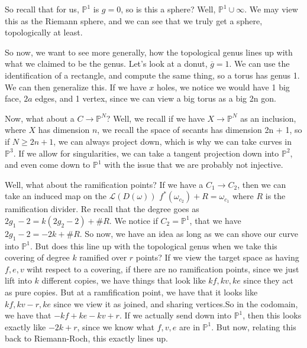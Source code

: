\documentclass[10pt]{article}
\begin{document}
So recall that for us, $\mathbb{P}^1$ is $g = 0$, so is this a sphere? Well, $\mathbb{P}^1 \cup \infty$. We may view this as the Riemann sphere, and we can see that we truly get a sphere, topologically at least.

So now, we want to see more generally, how the topological genus lines up with what we claimed to be the genus. Let’s look at a donut, $\overline{g} = 1$. We can use the identification of a rectangle, and compute the same thing, so a torus has genus 1. We can then generalize this. If we have $x$ holes, we notice we would have 1 big face, $2a$ edges, and 1 vertex, since we can view a big torus as a big 2n gon.

Now, what about a $C \to \mathbb{P}^{N}$? Well, we recall if we have $X \to \mathbb{P}^{N}$ as an inclusion, where $X$ has dimension $n$, we recall the space of secants has dimension 2n + 1, so if $N \geq 2n + 1$, we can always project down, which is why we can take curves in $\mathbb{P}^3$. If we allow for singularities, we can take a tangent projection down into $\mathbb{P}^2$, and even come down to $\mathbb{P}^1$ with the issue that we are probably not injective.

Well, what about the ramification points? If we have a $C_1 \to C_2$, then we can take an induced map on the $\mathcal{L}(D(\omega))$ $f^*(\omega_{c_2}) + R = \omega_{c_1}$ where $R$ is the ramification divider. Re recall that the degree goes as $2g_1 - 2 = k (2g_2 - 2) + \#R$. We notice if $C_2 = \mathbb{P}^1$, that we have $2g_1 - 2 = -2k + \#R$. So now, we have an idea as long as we can shove our curve into $\mathbb{P}^1$. But does this line up with the topological genus when we take this covering of degree $k$ ramified over $r$ points? If we view the target space as having $f, e, v$ wiht respect to a covering, if there are no ramification points, since we just lift into $k$ different copies, we have things that look like $kf, kv, ke$ since they act as pure copies. But at a ramfification point, we have that it looks like $kf, kv -r, ke$ since we view it as joined, and sharing vertices.So in the codomain, we have that $- kf + ke - kv + r$. If we actually send down into $\mathbb{P}^1$, then this looks exactly like $-2k + r$, since we know what $f, v, e$ are in $\mathbb{P}^1$. But now, relating this back to Riemann-Roch, this exactly lines up. 
\end{document}
